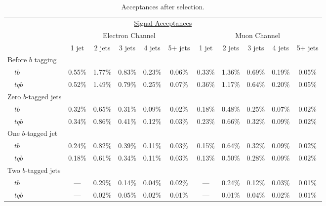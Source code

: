 \vspace{0.2in}
\begin{table}[!h!tbp]
\begin{center}
\begin{minipage}{6.5in}
\begin{ruledtabular}
\begin{tabular}{l||ccccc|ccccc}
\multicolumn{11}{c}{\hspace{1in}\underline{Signal Acceptances}} \vspace{0.1in} \\
& \multicolumn{5}{c|}{Electron Channel} & \multicolumn{5}{c}{Muon Channel} \\
                     & 1 jet & 2 jets & 3 jets & 4 jets & 5+ jets
                     & 1 jet & 2 jets & 3 jets & 4 jets & 5+ jets \\
\hline
Before $b$ tagging   &        &        &        &        &        &        &        &        &        &        \\
~~$tb$               & 0.55\% & 1.77\% & 0.83\% & 0.23\% & 0.06\% & 0.33\% & 1.36\% & 0.69\% & 0.19\% & 0.05\% \\
~~$tqb$              & 0.52\% & 1.49\% & 0.79\% & 0.25\% & 0.07\% & 0.36\% & 1.17\% & 0.64\% & 0.20\% & 0.05\% \\
Zero $b$-tagged jets &        &        &        &        &        &        &        &        &        &        \\
~~$tb$               & 0.32\% & 0.65\% & 0.31\% & 0.09\% & 0.02\% & 0.18\% & 0.48\% & 0.25\% & 0.07\% & 0.02\% \\
~~$tqb$              & 0.34\% & 0.86\% & 0.41\% & 0.12\% & 0.03\% & 0.23\% & 0.66\% & 0.32\% & 0.09\% & 0.02\% \\
One $b$-tagged jet   &        &        &        &        &        &        &        &        &        &        \\
~~$tb$               & 0.24\% & 0.82\% & 0.39\% & 0.11\% & 0.03\% & 0.15\% & 0.64\% & 0.32\% & 0.09\% & 0.02\% \\
~~$tqb$              & 0.18\% & 0.61\% & 0.34\% & 0.11\% & 0.03\% & 0.13\% & 0.50\% & 0.28\% & 0.09\% & 0.02\% \\
Two $b$-tagged jets  &        &        &        &        &        &        &        &        &        &        \\
~~$tb$               &  ---   & 0.29\% & 0.14\% & 0.04\% & 0.02\% &  ---   & 0.24\% & 0.12\% & 0.03\% & 0.01\% \\
~~$tqb$              &  ---   & 0.02\% & 0.05\% & 0.02\% & 0.01\% &  ---   & 0.01\% & 0.04\% & 0.02\% & 0.01\%
\end{tabular}
\end{ruledtabular}
\vspace{-0.1in}
\caption[acceptances]{Acceptances after selection.}
\label{acceptances}
\end{minipage}
\end{center}
\end{table}


